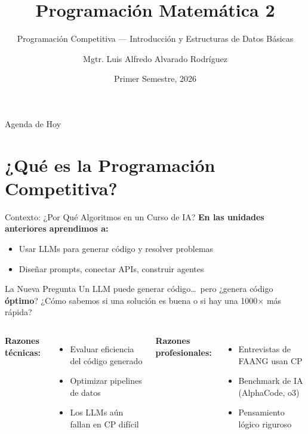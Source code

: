 \documentclass[aspectratio=169]{beamer}
\title[M503]{Programación Matemática 2}
\subtitle{Programación Competitiva --- Introducción y Estructuras de Datos Básicas}
\author[Luis Alfredo Alvarado]{Mgtr. Luis Alfredo Alvarado Rodríguez}
\institute[ECFM - USAC]{
    Escuela de Ciencias Físicas y Matemáticas \\
    Universidad de San Carlos de Guatemala
}
\date{Primer Semestre, 2026}
\begin{document}
\begin{frame}
    \titlepage
\end{frame}
\begin{frame}{Agenda de Hoy}
    \tableofcontents
\end{frame}
\section{¿Qué es la Programación Competitiva?}
\begin{frame}{Contexto: ¿Por Qué Algoritmos en un Curso de IA?}
    \textbf{En las unidades anteriores aprendimos a:}
    \begin{itemize}
        \item Usar LLMs para generar código y resolver problemas
        \item Diseñar prompts, conectar APIs, construir agentes
    \end{itemize}
    
    \vspace{0.3cm}
    \begin{block}{La Nueva Pregunta}
        Un LLM puede generar código\ldots\ pero ¿genera código \textbf{óptimo}? ¿Cómo sabemos si una solución es buena o si hay una 1000$\times$ más rápida?
    \end{block}
    
    \vspace{0.3cm}
    \begin{columns}[t]
        \textbf{Razones técnicas:}
        \begin{itemize}
            \item Evaluar eficiencia del código generado
            \item Optimizar pipelines de datos
            \item Los LLMs aún fallan en CP difícil
        \end{itemize}
        
        \textbf{Razones profesionales:}
        \begin{itemize}
            \item Entrevistas de FAANG usan CP
            \item Benchmark de IA (AlphaCode, o3)
            \item Pensamiento lógico riguroso
        \end{itemize}
    \end{columns}
\end{frame}
\end{document}
